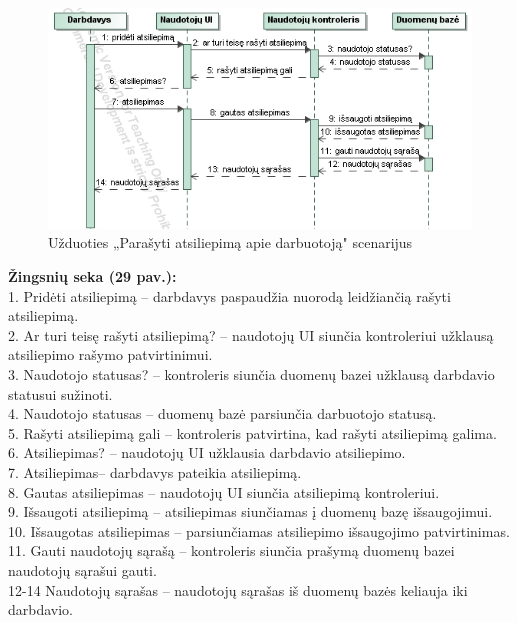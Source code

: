 \documentclass{VUMIFPSkursinis}
\begin{document}
%
\begin{figure}[H]
\centering
\includegraphics[width=\linewidth, frame]{img/seku(darbdavioatsiliepimas).png}
\caption{Užduoties „Parašyti atsiliepimą apie darbuotoją" scenarijus}
\end{figure}
	\textbf{Žingsnių seka (29 pav.):}\\
	1. Pridėti atsiliepimą – darbdavys paspaudžia nuorodą leidžiančią rašyti atsiliepimą.\\
	2. Ar turi teisę rašyti atsiliepimą? – naudotojų UI siunčia kontroleriui užklausą atsiliepimo rašymo patvirtinimui.\\
	3. Naudotojo statusas? – kontroleris siunčia duomenų bazei užklausą darbdavio statusui sužinoti.\\
	4. Naudotojo statusas – duomenų bazė parsiunčia darbuotojo statusą.\\
	5. Rašyti atsiliepimą gali – kontroleris patvirtina, kad rašyti atsiliepimą galima.\\
	6. Atsiliepimas? – naudotojų UI užklausia darbdavio atsiliepimo.\\
	7. Atsiliepimas– darbdavys pateikia atsiliepimą.\\
	8. Gautas atsiliepimas – naudotojų UI siunčia atsiliepimą kontroleriui.\\
	9. Išsaugoti atsiliepimą – atsiliepimas siunčiamas į duomenų bazę išsaugojimui.\\
	10. Išsaugotas atsiliepimas – parsiunčiamas atsiliepimo išsaugojimo patvirtinimas.\\
	11. Gauti naudotojų sąrašą – kontroleris siunčia prašymą duomenų bazei naudotojų sąrašui gauti.\\
	12-14 Naudotojų sąrašas – naudotojų sąrašas iš duomenų bazės keliauja iki darbdavio.\\
%
\end{document}
